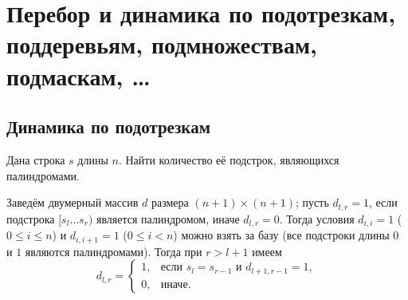 \section{Перебор и динамика по подотрезкам, поддеревьям,
подмножествам, подмаскам, \ldots}






\subsection{Динамика по подотрезкам}

\begin{problem}
    Дана строка $s$ длины $n$. Найти количество её подстрок, являющихся палиндромами.
\end{problem}

Заведём двумерный массив $d$ размера $(n + 1) \times (n + 1)$; пусть $d_{l, r} = 1$, если подстрока $[s_l\ldots s_r)$ является палиндромом, иначе $d_{l, r} = 0$. Тогда условия $d_{i, i} = 1$ ($0 \leqslant i \leqslant n$) и $d_{i, i + 1} = 1$ ($0 \leqslant i < n$) можно взять за базу (все подстроки длины $0$ и $1$ являются палиндромами). Тогда при $r > l + 1$ имеем
\[
    d_{l, r} =
    \begin{cases}
        1,&\text{если $s_l = s_{r - 1}$ и $d_{l + 1, r - 1} = 1$},\\
        0,&\text{иначе}.
    \end{cases}
\]

